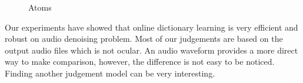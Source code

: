 \documentclass[UTF8]{article}
\begin{document}
\begin{figure}[H]
    \centering
    \caption{Atoms}
\end{figure}

Our experiments have showed that online dictionary learning is very efficient and robust on audio denoising problem. Most of our judgements are based on the output audio files which is not ocular. An audio waveform provides a more direct way to make comparison, however, the difference is not easy to be noticed. Finding another judgement model can be very interesting.



\nocite{*}
\end{document}
